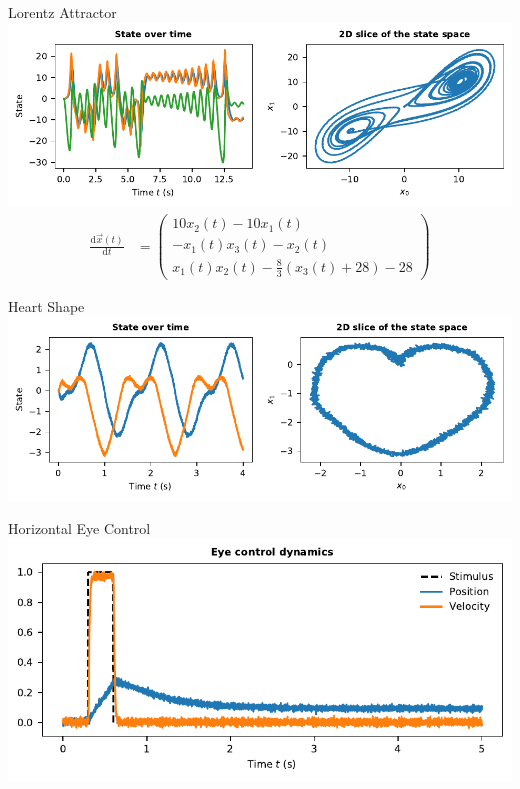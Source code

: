 \documentclass[handout,aspectratio=169]{beamer}
\begin{document}
	\begin{frame}{Lorentz Attractor}
		\centering
		\includegraphics[width=\textwidth]{media/example_lorentz.pdf}
		\begin{align*}
			\frac{\mathrm{d}\vec x(t)}{\mathrm{d}t} &= \begin{pmatrix}
			10 x_2(t)-10x_1(t) \\
			-x_1(t) x_3(t)-x_2(t) \\
			x_1(t) x_2(t) - \frac{8}{3}(x_3(t)+28)-28
			\end{pmatrix}
		\end{align*}
	\end{frame}

	\begin{frame}{Heart Shape}
		\centering
		\includegraphics[width=\textwidth]{media/example_heart.pdf}
	\end{frame}

	\begin{frame}{Horizontal Eye Control}
		\centering
		\includegraphics[width=\textwidth]{media/example_eye_control.pdf}
	\end{frame}
\end{document}
